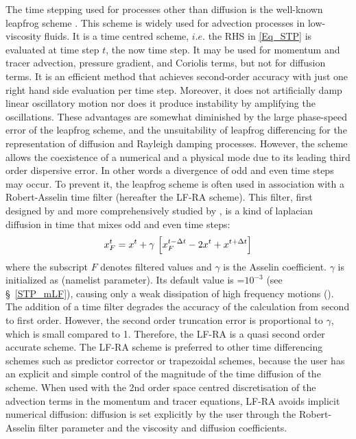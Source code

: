 The time stepping used for processes other than diffusion is the well-known leapfrog
scheme \citep{Mesinger_Arakawa_Bk76}.  This scheme is widely used for advection 
processes in low-viscosity fluids. It is a time centred scheme, $i.e.$ 
the RHS in \eqref{Eq_STP} is evaluated at time step $t$, the now time step. 
It may be used for momentum and tracer advection, 
pressure gradient, and Coriolis terms, but not for diffusion terms.
It is an efficient method that achieves 
second-order accuracy with just one right hand side evaluation per time step. 
Moreover, it does not artificially damp linear oscillatory motion nor does it produce 
instability by amplifying the oscillations. These advantages are somewhat diminished 
by the large phase-speed error of the leapfrog scheme, and the unsuitability 
of leapfrog differencing for the representation of diffusion and Rayleigh 
damping processes. However, the scheme allows the coexistence of a numerical 
and a physical mode due to its leading third order dispersive error. In other words a 
divergence of odd and even time steps may occur. To prevent it, the leapfrog scheme 
is often used in association with a Robert-Asselin time filter (hereafter the LF-RA scheme). 
This filter, first designed by \citet{Robert_JMSJ66} and more comprehensively studied 
by \citet{Asselin_MWR72}, is a kind of laplacian diffusion in time that mixes odd and 
even time steps:
\begin{equation} \label{Eq_STP_asselin}
x_F^t  = x^t + \gamma \, \left[ x_F^{t-\Delta t} - 2 x^t + x^{t+\Delta t} \right]
\end{equation} 
where the subscript $F$ denotes filtered values and $\gamma$ is the Asselin 
coefficient. $\gamma$ is initialized as  (namelist parameter). 
Its default value is =$10^{-3}$ (see \S~\ref{STP_mLF}), 
causing only a weak dissipation of high frequency motions (\citep{Farge1987}). 
The addition of a time filter degrades the accuracy of the 
calculation from second to first order. However, the second order truncation 
error is proportional to $\gamma$, which is small compared to 1. Therefore, 
the LF-RA is a quasi second order accurate scheme. The LF-RA scheme 
is preferred to other time differencing schemes such as 
predictor corrector or trapezoidal schemes, because the user has an explicit 
and simple control of the magnitude of the time diffusion of the scheme. 
When used with the 2nd order space centred discretisation of the 
advection terms in the momentum and tracer equations, LF-RA avoids implicit 
numerical diffusion: diffusion is set explicitly by the user through the Robert-Asselin 
filter parameter and the viscosity and diffusion coefficients.

